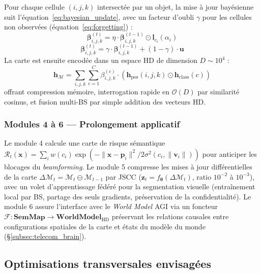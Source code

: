 \documentclass[12pt,a4paper,titlepage]{article}
\begin{document}
Pour chaque cellule $(i,j,k)$ intersectée par un objet, la mise à jour bayésienne suit l'équation~\eqref{eq:bayesian_update}, avec un facteur d'oubli $\gamma$ pour les cellules non observées (équation~\eqref{eq:forgetting}) :
\begin{equation}
    \boldsymbol{\beta}_{i,j,k}^{(t)} = \eta \cdot \boldsymbol{\beta}_{i,j,k}^{(t-1)} \odot \mathbf{l}_{c_i}(\alpha_i)
    \label{eq:bayesian_update}
\end{equation}
\begin{equation}
    \boldsymbol{\beta}_{i,j,k}^{(t)} = \gamma \cdot \boldsymbol{\beta}_{i,j,k}^{(t-1)} + (1-\gamma) \cdot \mathbf{u}
    \label{eq:forgetting}
\end{equation}
La carte est ensuite encodée dans un espace HD de dimension $D\sim10^4$ :
\begin{equation}
    \mathbf{h}_{\mathcal{M}} = \sum_{i,j,k} \sum_{c=1}^{C} \beta_{i,j,k}^{(c)} \cdot \left( \mathbf{h}_{\text{pos}}(i,j,k) \odot \mathbf{h}_{\text{class}}(c) \right)
    \label{eq:hd_encoding}
\end{equation}
offrant compression mémoire, interrogation rapide en $\mathcal{O}(D)$ par similarité cosinus, et fusion multi-BS par simple addition des vecteurs HD.

\subsubsection{Modules 4 à 6 --- Prolongement applicatif}

Le module 4 calcule une carte de risque sémantique $\mathcal{R}_t(\mathbf{x}) = \sum_i w(c_i)\exp(-\|\mathbf{x}-\mathbf{p}_i\|^2 / 2\sigma^2(c_i,\|\mathbf{v}_i\|))$ pour anticiper les blocages du \textit{beamforming}. Le module 5 compresse les mises à jour différentielles de la carte $\Delta\mathcal{M}_t = \mathcal{M}_t \ominus \mathcal{M}_{t-1}$ par JSCC ($\mathbf{z}_t = f_{\boldsymbol{\theta}}(\Delta\mathcal{M}_t)$, ratio $10^{-2}$ à $10^{-3}$), avec un volet d'apprentissage fédéré pour la segmentation visuelle (entraînement local par BS, partage des seuls gradients, préservation de la confidentialité). Le module 6 assure l'interface avec le \textit{World Model} AGI via un foncteur $\mathcal{F}: \mathbf{SemMap} \to \mathbf{WorldModel}_{\text{HD}}$ préservant les relations causales entre configurations spatiales de la carte et états du modèle du monde (\S\ref{subsec:telecom_brain}).

\subsection{Optimisations transversales envisagées}
\end{document}
